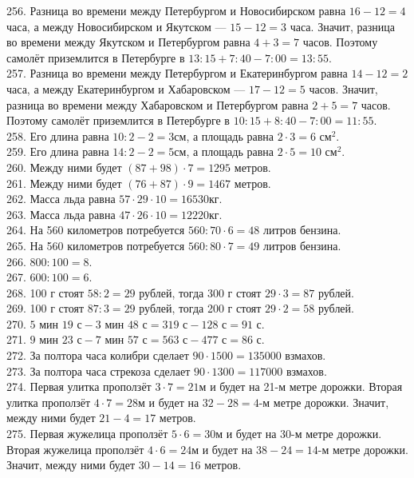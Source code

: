 256. Разница во времени между Петербургом и Новосибирском равна $16-12=4$ часа, а между Новосибирском и Якутском --- $15-12=3$ часа. Значит, разница во времени между Якутском и Петербургом равна $4+3=7$ часов. Поэтому самолёт приземлится в Петербурге в $13:15+7:40-7:00=13:55.$\\
257. Разница во времени между Петербургом и Екатеринбургом равна $14-12=2$ часа, а между Екатеринбургом и Хабаровском --- $17-12=5$ часов. Значит, разница во времени между Хабаровском и Петербургом равна $2+5=7$ часов. Поэтому самолёт приземлится в Петербурге в $10:15+8:40-7:00=11:55.$\\
258. Его длина равна $10:2-2=3$см, а площадь равна $2\cdot3=6\text{ см}^2.$\\
259. Его длина равна $14:2-2=5$см, а площадь равна $2\cdot5=10\text{ см}^2.$\\
260. Между ними будет $(87+98)\cdot7=1295$ метров.\\
261. Между ними будет $(76+87)\cdot9=1467$ метров.\\
262. Масса льда равна $57\cdot29\cdot10=16530$кг.\\
263. Масса льда равна $47\cdot26\cdot10=12220$кг.\\
264. На 560 километров потребуется $560:70\cdot6=48$ литров бензина.\\
265. На 560 километров потребуется $560:80\cdot7=49$ литров бензина.\\
266. $800:100=8.$\\
267. $600:100=6.$\\
268. 100 г стоят $58:2=29$ рублей, тогда 300 г стоят $29\cdot3=87$ рублей.\\
269. 100 г стоят $87:3=29$ рублей, тогда 200 г стоят $29\cdot2=58$ рублей.\\
270. $5\text{ мин }19\text{ с}- 3\text{ мин }48\text{ с}=319\text{ с}-128\text{ с}=91\text{ с}.$\\
271. $9\text{ мин }23\text{ с}- 7\text{ мин }57\text{ с}=563\text{ с}-477\text{ с}=86\text{ с}.$\\
272. За полтора часа колибри сделает $90\cdot1500=135000$ взмахов.\\
273. За полтора часа стрекоза сделает $90\cdot1300=117000$ взмахов.\\
274. Первая улитка проползёт $3\cdot7=21$м и будет на 21-м метре дорожки. Вторая улитка проползёт $4\cdot7=28$м и будет на $32-28=4$-м метре дорожки. Значит, между ними будет $21-4=17$ метров.\\
275. Первая жужелица проползёт $5\cdot6=30$м и будет на 30-м метре дорожки. Вторая жужелица проползёт $4\cdot6=24$м и будет на $38-24=14$-м метре дорожки. Значит, между ними будет $30-14=16$ метров.\\

